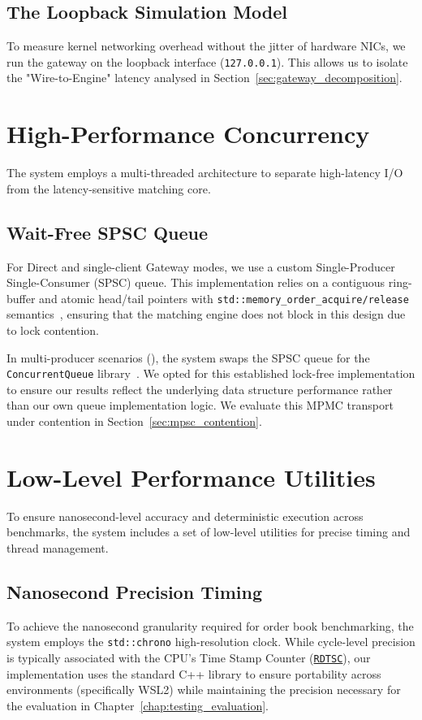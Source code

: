 \subsection{The Loopback Simulation Model}
To measure kernel networking overhead without the jitter of hardware 
NICs, we run the gateway on the loopback interface (\texttt{127.0.0.1}). 
This allows us to isolate the "Wire-to-Engine" latency analysed in 
Section~\ref{sec:gateway_decomposition}.

\section{High-Performance Concurrency}
The system employs a multi-threaded architecture to separate high-latency 
I/O from the latency-sensitive matching core.

\subsection{Wait-Free SPSC Queue}
For Direct and single-client Gateway modes, we use a custom 
Single-Producer Single-Consumer (SPSC) queue. This implementation 
relies on a contiguous ring-buffer and atomic head/tail pointers 
with \texttt{std::memory\_order\_acquire/release} semantics~\citep{michael1996simple}, ensuring 
that the matching engine does not block in this design due to lock contention.

In multi-producer scenarios (), the system swaps the SPSC queue 
for the \texttt{ConcurrentQueue} library~\citep{moodycamel_concurrentqueue}. 
We opted for this established lock-free implementation to ensure our results 
reflect the underlying data structure performance rather than our own 
queue implementation logic. We evaluate this MPMC transport under 
contention in Section~\ref{sec:mpsc_contention}.

\section{Low-Level Performance Utilities}
To ensure nanosecond-level accuracy and deterministic execution across 
benchmarks, the system includes a set of low-level utilities for 
precise timing and thread management.

\subsection{Nanosecond Precision Timing}
To achieve the nanosecond granularity required for order book benchmarking, 
the system employs the \texttt{std::chrono} high-resolution clock. While 
cycle-level precision is typically associated with the CPU's Time Stamp 
Counter (\hyperref[app:glossary]{\texttt{RDTSC}}), our implementation uses the standard C++ library 
to ensure portability across environments (specifically WSL2) while 
maintaining the precision necessary for the evaluation in 
Chapter~\ref{chap:testing_evaluation}.

